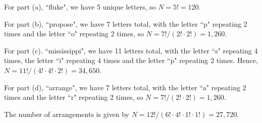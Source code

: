 \documentclass[a4paper,12pt]{article}
\begin{document}
\vspace{2mm}
For part (a), ``fluke", we have 5 unique letters, so $N = 5! = 120$.

\vspace{2mm}
For part (b), ``propose", we have 7 letters total, with the letter ``p" repeating 2 times and the letter ``o" repeating 2 times, so $N = 7! / (2! \cdot 2!) = 1,260$.

\vspace{2mm}
For part (c), ``mississippi", we have 11 letters total, with the letter ``s" repeating 4 times, the letter ``i" repeating 4 times and the letter ``p" repeating 2 times. Hence, $N = 11!/(4! \cdot 4! \cdot 2!) = 34,650$.

\vspace{2mm}
For part (d), ``arrange", we have 7 letters total, with the letter ``a" repeating 2 times and the letter ``r" repeating 2 times, so $N = 7!/(2! \cdot 2!) = 1,260$.

\vspace{4mm}

\vspace{2mm}
The number of arrangements is given by $N = 12!/(6! \cdot 4! \cdot 1! \cdot 1!) = 27,720$.

\vspace{4mm}
\end{document}
